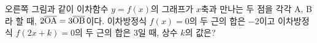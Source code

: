 \noindent\begin{minipage}[t]{0.58\linewidth}\vspace{0pt}\raggedright 오른쪽 그림과 같이 이차함수 $y=f(x)$의 그래프가 $x$축과 만나는 두 점을 각각 A, B라 할 때, $2\overline{\mathrm{OA}}=3\overline{\mathrm{OB}}$이다. 이차방정식 $f(x)=0$의 두 근의 합은 $-2$이고 이차방정식 $f(2x+k)=0$의 두 근의 합은 $3$일 때, 상수 $k$의 값은? \end{minipage}\hfill\begin{minipage}[t]{0.4\linewidth}\vspace{0pt}\centering \resizebox{\ifdim\width>\linewidth\linewidth\else\width\fi}{!}{}\end{minipage}\par
{}
